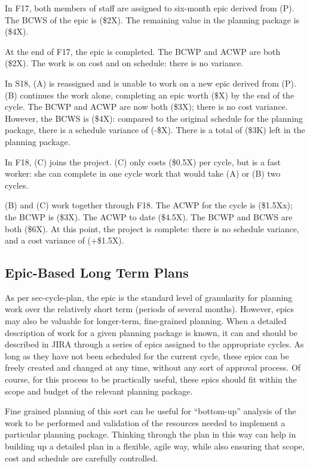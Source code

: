 In F17, both members of staff are assigned to six-month epic derived
from (P). The BCWS of the epic is (\$2X). The remaining value in the
planning package is (\$4X).

At the end of F17, the epic is completed. The BCWP and ACWP are both
(\$2X). The work is on cost and on schedule: there is no variance.

In S18, (A) is reassigned and is unable to work on a new epic derived
from (P). (B) continues the work alone, completing an epic worth
(\$X) by the end of the cycle. The BCWP and ACWP are now both (\$3X);
there is no cost variance. However, the BCWS is (\$4X): compared to the
original schedule for the planning package, there is a schedule variance
of (-\$X). There is a total of (\$3K) left in the planning package.

In F18, (C) joins the project. (C) only costs (\$0.5X) per cycle,
but is a fast worker: she can complete in one cycle work that would take
(A) or (B) two cycles.

(B) and (C) work together through F18. The ACWP for the cycle is
(\$1.5Xx); the BCWP is (\$3X). The ACWP to date (\$4.5X). The BCWP and
BCWS are both (\$6X). At this point, the project is complete: there is
no schedule variance, and a cost variance of (+\$1.5X).

\subsection{Epic-Based Long Term
Plans}\label{epic-based-long-term-plans}

As per sec-cycle-plan, the epic is the standard level of granularity for
planning work over the relatively short term (periods of several
months). However, epics may also be valuable for longer-term,
fine-grained planning. When a detailed description of work for a given
planning package is known, it can and should be described in JIRA
through a series of epics assigned to the appropriate cycles. As long as
they have not been scheduled for the current cycle, these epics can be
freely created and changed at any time, without any sort of approval
process. Of course, for this process to be practically useful, these
epics should fit within the scope and budget of the relevant planning
package.

Fine grained planning of this sort can be useful for ``bottom-up''
analysis of the work to be performed and validation of the resources
needed to implement a particular planning package. Thinking through the
plan in this way can help in building up a detailed plan in a flexible,
agile way, while also ensuring that scope, cost and schedule are
carefully controlled.

